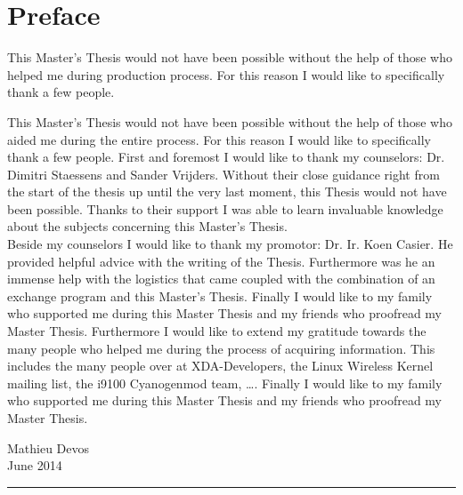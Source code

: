 \chapter*{Preface}


This Master's Thesis would not have been possible without the help of those who helped me during production process. For this reason I would like to specifically thank a few people.

This Master's Thesis would not have been possible without the help of those who aided me during the entire process. For this reason I would like to specifically thank a few people. 
\npar
First and foremost I would like to thank my counselors: Dr. Dimitri Staessens and Sander Vrijders. Without their close guidance right from the start of the thesis up until the very last moment, this Thesis would not have been possible. Thanks to their support I was able to learn invaluable knowledge about the subjects concerning this Master's Thesis. 
\\
Beside my counselors I would like to thank my promotor: Dr. Ir. Koen Casier. He provided helpful advice with the writing of the Thesis. Furthermore was he an immense help with the logistics that came coupled with the combination of an exchange program and this Master's Thesis. 
\npar
Finally I would like to my family who supported me during this Master Thesis and my friends who proofread my Master Thesis. Furthermore I would like to extend my gratitude towards the many people who helped me during the process of acquiring information. This includes the many people over at XDA-Developers, the Linux Wireless Kernel mailing list, the i9100 Cyanogenmod team, \ldots.
\npar
Finally I would like to my family who supported me during this Master Thesis and my friends who proofread my Master Thesis. 

\vfill

\begin{flushright}
	Mathieu Devos
	\\
	June 2014 \\
	\rule{90pt}{0.4pt}
\end{flushright}
